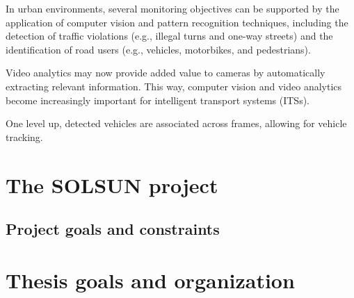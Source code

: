 In urban environments, several monitoring objectives can
be supported by the application of computer vision and pattern
recognition techniques, including the detection of traffic
violations (e.g., illegal turns and one-way streets) and the
identification of road users (e.g., vehicles, motorbikes, and
pedestrians).

Video analytics may now provide added value to cameras by automatically
extracting relevant information. This way, computer
vision and video analytics become increasingly important for
intelligent transport systems (ITSs).

One level up, detected vehicles
are associated across frames, allowing for vehicle tracking.
\section{The SOLSUN project}
\subsection{Project goals and constraints}

\section{Thesis goals and organization}
